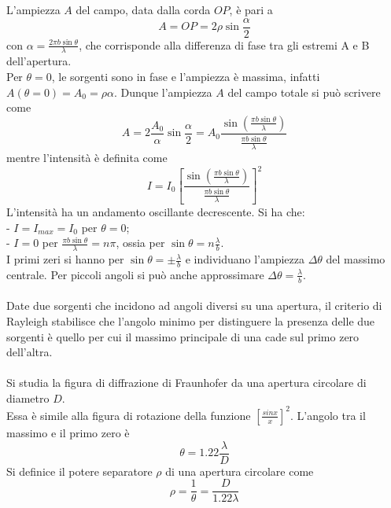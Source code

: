 \documentclass{article}
\begin{document}
L’ampiezza $A$ del campo, data dalla corda $OP$, è pari a
\begin{equation}
    A=OP=2\rho\sin\frac{\alpha}{2}
    \nonumber
\end{equation}
con $\alpha=\frac{2\pi b\sin\theta}{\lambda}$, che corrisponde alla differenza di fase tra gli estremi A e B dell'apertura.\\
Per $\theta=0$, le sorgenti sono in fase e l’ampiezza è massima, infatti $A(\theta=0)=A_0=\rho\alpha$. Dunque l’ampiezza $A$ del campo totale si può scrivere come
\begin{equation}
    A=2\frac{A_0}{\alpha}\sin\frac{\alpha}{2}=A_0\frac{\sin\left(\frac{\pi b\sin\theta}{\lambda}\right)}{\frac{\pi b\sin\theta}{\lambda}}
    \nonumber
\end{equation}
mentre l'intensità è definita come
\begin{equation}
    I=I_0\left[\frac{\sin\left(\frac{\pi b\sin\theta}{\lambda}\right)}{\frac{\pi b\sin\theta}{\lambda}}\right]^2
    \nonumber
\end{equation}
L'intensità ha un andamento oscillante decrescente. Si ha che: \\
- $I=I_{max}=I_0$ per $\theta=0$;\\
- $I=0$ per $\frac{\pi b\sin\theta}{\lambda}=n\pi$, ossia per $\sin\theta=n\frac{\lambda}{b}$.\\
I primi zeri si hanno per $\sin\theta=\pm\frac{\lambda}{b}$ e individuano l'ampiezza $\Delta\theta$ del massimo centrale. Per piccoli angoli si può anche approssimare $\Delta\theta=\frac{\lambda}{b}$.\\
\\
Date due sorgenti che incidono ad angoli diversi su una apertura, il criterio di Rayleigh stabilisce che l’angolo minimo per distinguere  la presenza delle due sorgenti è quello per cui il massimo principale di una cade sul primo zero dell'altra.\\
\\
Si studia la figura di diffrazione di Fraunhofer da una apertura circolare di diametro $D$.\\
Essa è simile alla figura di rotazione della funzione $[\frac{sin x}{x}]^2$. L'angolo tra il massimo e il primo zero è 
\begin{equation}
    \theta=1.22\frac{\lambda}{D}
    \nonumber
\end{equation}
Si definice il potere separatore $\rho$ di una apertura circolare come
\begin{equation}
    \rho=\frac{1}{\theta}=\frac{D}{1.22\lambda}
    \nonumber
\end{equation}
\end{document}
